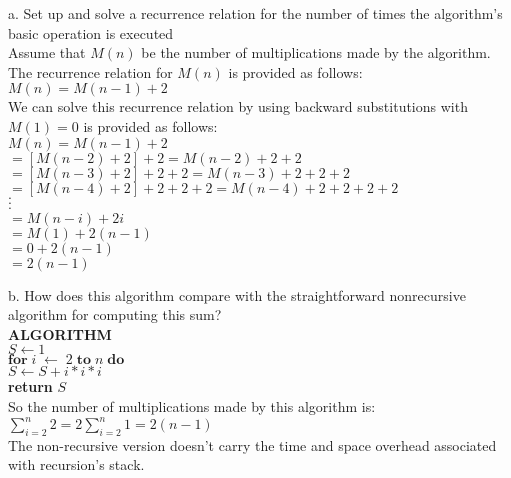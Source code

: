 \documentclass[8pt, letterpaper]{article}
\begin{document}
\indent a. Set up and solve a recurrence relation for the number of times the algorithm's basic operation is executed \\
\indent Assume that $M(n)$ be the number of multiplications made by the algorithm. The recurrence relation for $M(n)$ is provided as follows: $M(n) = M(n-1) + 2$ \\
\indent We can solve this recurrence relation by using backward substitutions with $M(1) = 0$ is provided as follows: \\
\indent $M(n) = M(n-1) + 2$ \\
\indent $= [M(n-2) + 2] + 2 = M(n-2) + 2 + 2$ \\
\indent $= [M(n-3) + 2] + 2 + 2 = M(n-3) + 2 + 2 + 2$\\
\indent $= [M(n-4) + 2] + 2 + 2 + 2 = M(n-4) + 2 + 2 + 2 + 2$\\
\indent \indent \indent \indent $\cdot$ \\
\indent \indent \indent \indent $\cdot$ \\
\indent \indent \indent \indent $\cdot$ \\
\indent $= M(n-i) + 2i$ \\
\indent $= M(1) + 2(n-1)$ \\
\indent $= 0 + 2(n-1)$ \\
\indent $= 2(n-1)$ 

\indent b. How does this algorithm compare with the straightforward nonrecursive algorithm for computing this sum? \\
\textbf{ALGORITHM} \\
\indent $S \leftarrow 1$ \\
\indent $\textbf{for}\; i \; \leftarrow \; 2 \; \textbf{to} \; n \; \textbf{do}$ \\
\indent \indent $S \leftarrow S + i * i * i$ \\
\indent \textbf{return} $S$ \\
\indent So the number of multiplications made by this algorithm is: \\ 
\indent \indent \indent \indent \indent $\sum\limits_{i=2}^{n} 2 = 2\sum\limits_{i=2}^{n} 1 = 2(n-1)$ \\
\indent The non-recursive version doesn't carry the time and space overhead associated with recursion's stack. 
\end{document}
